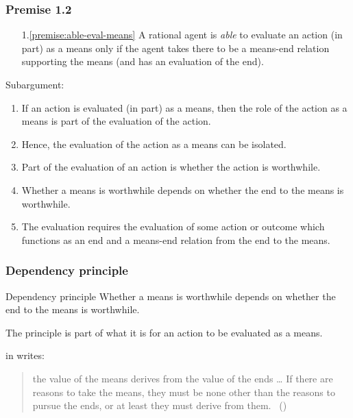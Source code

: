 \documentclass[noamssymb,
]{beamer} %
\newcommand{\hozlinedash}[0]{%
  \noindent\hdashrule[0.5ex][c]{\textwidth}{.1pt}{2.5pt}
}
\begin{document}
\begin{frame}
  \frametitle{Premise 1.2}

  \begin{enumerate}
  \item[1.\ref{premise:able-eval-means}] A rational agent is \emph{able} to evaluate an action (in part) as a means only if the agent takes there to be a means-end relation supporting the means (and has an evaluation of the end).
  \end{enumerate}

  \hozlinedash

  Subargument:

  \begin{enumerate}
  \item If an action is evaluated (in part) as a means, then the role of the action as a means is part of the evaluation of the action.
  \item Hence, the evaluation of the action as a means can be isolated.
  \item Part of the evaluation of an action is whether the action is worthwhile.
  \item Whether a means is worthwhile depends on whether the end to the means is worthwhile.
  \item The evaluation requires the evaluation of some action or outcome which functions as an end and a means-end relation from the end to the means.
  \end{enumerate}
\end{frame}

\begin{frame}
  \frametitle{Dependency principle}

  \begin{block}{Dependency principle}
    Whether a means is worthwhile depends on whether the end to the means is worthwhile.
  \end{block}

The principle is part of what it is for an action to be evaluated as a means.


\citeauthor{Raz:2005aa} in  writes:
\begin{quote}
    the value of the means derives from the value of the ends \dots
    If there are reasons to take the means, they must be none other than the reasons to pursue the ends, or at least they must derive from them.\nolinebreak
  \mbox{ }\hfill(\cite[2]{Raz:2005aa})
\end{quote}

\end{frame}
\end{document}

